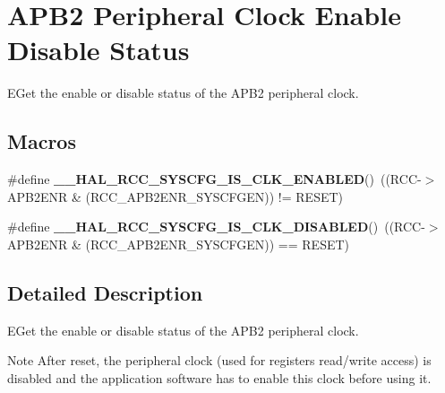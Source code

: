 \hypertarget{group___r_c_c___a_p_b2___clock___enable___disable___status}{}\section{A\+P\+B2 Peripheral Clock Enable Disable Status}
\label{group___r_c_c___a_p_b2___clock___enable___disable___status}


E\+Get the enable or disable status of the A\+P\+B2 peripheral clock.  


\subsection*{Macros}
\begin{DoxyCompactItemize}
\item 
\mbox{\label{group___r_c_c___a_p_b2___clock___enable___disable___status_gad1ea95d1d5f3a2ecf2b903c4ed22e7c6}} 
\#define {\bfseries \+\_\+\+\_\+\+H\+A\+L\+\_\+\+R\+C\+C\+\_\+\+S\+Y\+S\+C\+F\+G\+\_\+\+I\+S\+\_\+\+C\+L\+K\+\_\+\+E\+N\+A\+B\+L\+ED}()~((R\+CC-\/$>$A\+P\+B2\+E\+NR \& (R\+C\+C\+\_\+\+A\+P\+B2\+E\+N\+R\+\_\+\+S\+Y\+S\+C\+F\+G\+EN)) != R\+E\+S\+ET)
\item 
\mbox{\label{group___r_c_c___a_p_b2___clock___enable___disable___status_ga9f32ce5d57fe1d7a4871552d2e9a5b0e}} 
\#define {\bfseries \+\_\+\+\_\+\+H\+A\+L\+\_\+\+R\+C\+C\+\_\+\+S\+Y\+S\+C\+F\+G\+\_\+\+I\+S\+\_\+\+C\+L\+K\+\_\+\+D\+I\+S\+A\+B\+L\+ED}()~((R\+CC-\/$>$A\+P\+B2\+E\+NR \& (R\+C\+C\+\_\+\+A\+P\+B2\+E\+N\+R\+\_\+\+S\+Y\+S\+C\+F\+G\+EN)) == R\+E\+S\+ET)
\end{DoxyCompactItemize}


\subsection{Detailed Description}
E\+Get the enable or disable status of the A\+P\+B2 peripheral clock. 

\begin{DoxyNote}{Note}
After reset, the peripheral clock (used for registers read/write access) is disabled and the application software has to enable this clock before using it. 
\end{DoxyNote}
